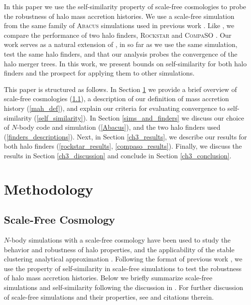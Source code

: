 In this paper we use the self-similarity property of scale-free cosmologies to probe the robustness of halo mass accretion histories. We use a scale-free simulation from the same family of \textsc{Abacus} simulations \cite{Garrison_2021_ABACUS} used in previous work \cite[e.g,][]{Maleubre_2024}. Like \cite{Maleubre_2024}, we compare the performance of two halo finders, \textsc{Rockstar} \cite{Rockstar} and \textsc{CompaSO} \cite{CompaSO}. Our work serves as a natural extension of \cite{Maleubre_2024}, in so far as we use the same simulation, test the same halo finders, and that our analysis probes the convergence of the halo merger trees. In this work, we present bounds on self-similarity for both halo finders and the prospect for applying them to other simulations. 

This paper is structured as follows. In Section \ref{ch3_methods} we provide a brief overview of scale-free cosmologies (\ref{scale_free}), a description of our definition of mass accretion history (\ref{mah_def}), and explain our criteria for evaluating convergence to self-similarity (\ref{self_similarity}). In Section \ref{sims_and_finders} we discuss our choice of $N$-body code and simulation (\ref{Abacus}), and the two halo finders used (\ref{finders_descriptions}). Next, in Section \ref{ch3_results}, we describe our results for both halo finders (\ref{rockstar_results}, \ref{compaso_results}). Finally, we discuss the results in Section \ref{ch3_discussion} and conclude in Section \ref{ch3_conclusion}.

\section{Methodology}\label{ch3_methods}
\subsection{Scale-Free Cosmology}\label{scale_free}
$N$-body simulations with a scale-free cosmology have been used to study the behavior and robustness of halo properties, and the applicability of the stable clustering analytical approximation \cite[e.g.,][]{Efstathiou_1988, Colombi_1996, Cole_1996, Joyce_2007, Knollmann_2008, Elahi_2009}. Following the format of previous work \cite[][]{Joyce_2021, Leroy_2021, Garrison_2021_softening, Garrison_2022_k_nearest, Maleubre_2022, Maleubre_2023, Maleubre_2024}, we use the property of self-similarity in scale-free simulations to test the robustness of halo mass accretion histories. Below we briefly summarize scale-free simulations and self-similarity following the discussion in \cite{Maleubre_2024}. For further discussion of scale-free simulations and their properties, see \cite{Joyce_2021} and citations therein.

